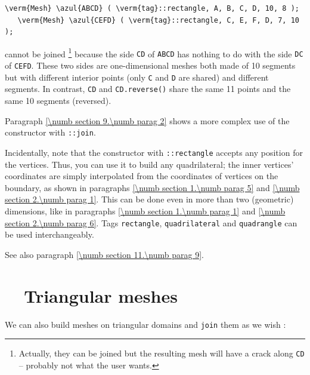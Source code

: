 \begin{Verbatim}[commandchars=\\\{\},formatcom=\small\tt,baselinestretch=0.94]
   \verm{Mesh} \azul{ABCD} ( \verm{tag}::rectangle, A, B, C, D, 10, 8 );
   \verm{Mesh} \azul{CEFD} ( \verm{tag}::rectangle, C, E, F, D, 7, 10 );
\end{Verbatim}

\noindent cannot be joined%
\footnote {Actually, they can be joined but the resulting mesh will have
a crack along {\small\tt CD} -- probably not what the user wants.}
because the side {\small\tt CD} of {\small\tt ABCD} has nothing to do with the side 
{\small\tt DC} of {\small\tt CEFD}.
These two sides are one-dimensional meshes both made of 10 segments but with different
interior points (only {\small\tt C} and {\small\tt D} are shared) and different segments.
In contrast, {\small\tt CD} and {\small\tt CD.reverse()} share the same 11 points and
the same 10 segments (reversed).

Paragraph \ref{\numb section 9.\numb parag 2} shows a more complex use of the {\small\tt {}}
constructor with {\small\tt {}::join}.

Incidentally, note that the {\small\tt {}} constructor with {\small\tt {}::rectangle} accepts
any position for the vertices. 
Thus, you can use it to build any quadrilateral; the inner vertices' coordinates are simply
interpolated from the coordinates of vertices on the boundary, as shown in paragraphs
\ref{\numb section 1.\numb parag 5} and \ref{\numb section 2.\numb parag 1}.
This can be done even in more than two (geometric) dimensions, like in
paragraphs \ref{\numb section 1.\numb parag 1} and \ref{\numb section 2.\numb parag 6}.
Tags {\small\tt rectangle}, {\small\tt quadrilateral} and {\small\tt quadrangle} can be used
interchangeably.

See also paragraph \ref{\numb section 11.\numb parag 9}.


\section{~~Triangular meshes}\label{\numb section 1.\numb parag 4}

We can also build meshes on triangular domains and {\small\tt join} them as we wish :

